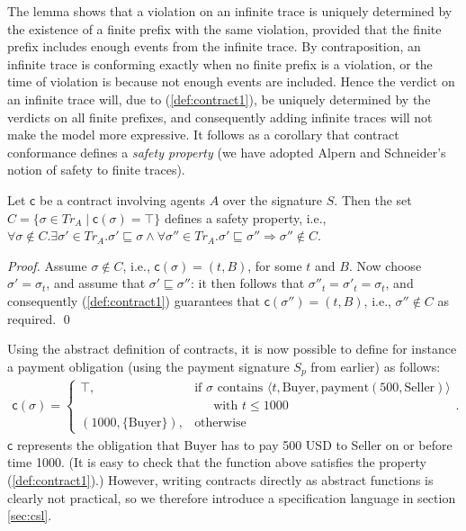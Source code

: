 \documentclass[orivec,final]{llncs-href}
\newcommand{\traceset}[1]{\mathit{Tr}_{#1}}
\newcommand{\trace}{\sigma}
\newcommand{\conforming}{\top}
\newcommand{\contract}{\mathsf{c}}
\newcommand{\event}[3]{\langle #1,#2,#3\rangle}
\begin{document}
The lemma shows that a violation on an infinite trace is uniquely
determined by the existence of a finite prefix with the same
violation, provided that the finite prefix includes enough events from
the infinite trace. By contraposition, an infinite trace is conforming
exactly when no finite prefix is a violation, or the time of
violation is because not enough events are included. Hence the verdict
on an infinite trace will, due to (\ref{def:contract1}), be uniquely determined
by the verdicts on all finite prefixes, and consequently adding
infinite traces will not make the model more expressive. It follows as
a corollary that contract conformance defines a \emph{safety property}
\cite{alpern84definingliveness} (we have adopted Alpern and
Schneider's notion of safety to finite traces).
\begin{lemma}
  Let $\contract$ be a contract involving agents $A$ over the
  signature $S$. Then the set $C = \{\trace \in \traceset{A} \mathbin{|}
  \contract(\trace) = \conforming \}$ defines a safety property, i.e.,
  $\forall \trace \not\in C. \exists \trace' \in \traceset{A}. \trace'
  \sqsubseteq \trace \land \forall \trace'' \in \traceset{A}. \trace'
  \sqsubseteq \trace'' \Rightarrow \trace'' \not\in C$.
\end{lemma}
\begin{proof}
  Assume $\trace \not\in C$, i.e., $\contract(\trace) = (t,B)$, for
  some $t$ and $B$. Now choose $\trace' = \trace_{t}$, and assume
  that $\trace' \sqsubseteq \trace''$: it then follows that $\trace''_t =
  \trace'_t = \trace_t$, and consequently (\ref{def:contract1}) guarantees that
  $\contract(\trace'') = (t,B)$, i.e., $\trace'' \not\in C$ as required.
  \qed
\end{proof}

Using the abstract definition of contracts, it is now
possible to define for instance a payment obligation (using the
payment signature $S_p$ from earlier) as follows:
\label{abstractexamplecontract}
\begin{align*}
\contract(\trace) = \left\{
  \begin{array}{ll}
    \conforming, &\mbox{if } \trace \mbox{ contains }
    \event{t}{\mathrm{Buyer}}{\mathrm{payment}(500,\mathrm{Seller})}\\
    & \hspace{18pt} \mbox{with } t \leq 1000\\
    (1000,\{\mathrm{Buyer}\}), &\mbox{otherwise}
  \end{array}
\right. .
\end{align*}
$\contract$ represents the obligation that Buyer has to pay 500 USD
to Seller on or before time 1000. (It is easy to check that the
function above satisfies the property (\ref{def:contract1}).)
However, writing contracts directly as abstract functions is clearly
not practical, so we therefore introduce a specification language in
section \ref{sec:csl}.
\end{document}
